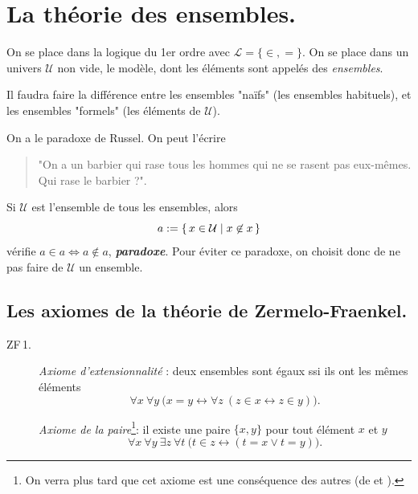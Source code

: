\documentclass[./main]{subfiles}
\begin{document}
  \chapter{La théorie des ensembles.}

  On se place dans la logique du 1er ordre avec $\mathcal{L} = \{{\in}, {=}\}$.
  On se place dans un univers $\mathcal{U}$ non vide, le modèle, dont les éléments sont appelés des \textit{ensembles}.

  Il faudra faire la différence entre les ensembles "naïfs" (les ensembles habituels), et les ensembles "formels" (les éléments de $\mathcal{U}$).

  On a le paradoxe de Russel. On peut l'écrire 
  \begin{quote}
    "On a un barbier qui rase tous les hommes qui ne se rasent pas eux-mêmes. Qui rase le barbier ?".
  \end{quote}
  Si $\mathcal{U}$ est l'ensemble de tous les ensembles, alors \[
  a := \mleft\{\,x \in \mathcal{U} \;\middle|\; x \not\in x\,\mright\}
  \]
  vérifie $a \in a \iff a \not\in a$, \textit{\textbf{paradoxe}}.
  Pour éviter ce paradoxe, on choisit donc de ne pas faire de $\mathcal{U}$ un ensemble.

  \section{Les axiomes de la théorie de Zermelo-Fraenkel.}

  \begin{description}
    \item[ZF\,1.\label{ZF1}] \textit{Axiome d'extensionnalité} : deux ensembles sont égaux ssi ils ont les mêmes éléments \[
      \forall x \: \forall y \: \big(x = y \leftrightarrow \forall z \: (z \in x \leftrightarrow z \in y)\big)
      .\]
  \end{description}

  \begin{description}
    \item[\bullet\label{pair-axiom}] \textit{Axiome de la paire}\footnote{On verra plus tard que cet axiome est une conséquence des autres (de  et ).}\showfootnote :
      il existe une paire $\{x,y\}$ pour tout élément $x$ et $y$
      \[
      \forall x \: \forall y \: \exists  z\: \forall t\: \big(t \in z \leftrightarrow (t = x \lor t = y)\big)
      .\]
  \end{description}
\end{document}
